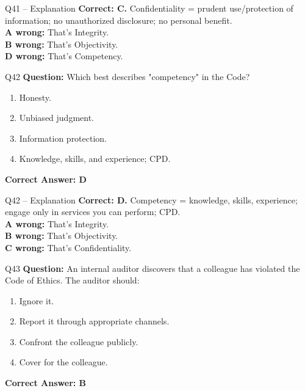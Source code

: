\documentclass[aspectratio=169,10pt]{beamer}
\begin{document}
	\begin{frame}[t]{Q41 -- Explanation}
		\small
		\textbf{Correct: C.} Confidentiality = prudent use/protection of information; no unauthorized disclosure; no personal benefit. \\[4pt]
		\textbf{A wrong:} That's Integrity. \\[2pt]
		\textbf{B wrong:} That's Objectivity. \\[2pt]
		\textbf{D wrong:} That's Competency.
	\end{frame}
	
	\begin{frame}[t]{Q42}
		\small
		\textbf{Question:} Which best describes "competency" in the Code?
		\begin{enumerate}[label=\Alph*.,itemsep=1pt,topsep=2pt]
			\item Honesty.
			\item Unbiased judgment.
			\item Information protection.
			\item Knowledge, skills, and experience; CPD.
		\end{enumerate}
		\vspace{4pt}
		\textbf{Correct Answer: D}
	\end{frame}
	
	\begin{frame}[t]{Q42 -- Explanation}
		\small
		\textbf{Correct: D.} Competency = knowledge, skills, experience; engage only in services you can perform; CPD. \\[4pt]
		\textbf{A wrong:} That's Integrity. \\[2pt]
		\textbf{B wrong:} That's Objectivity. \\[2pt]
		\textbf{C wrong:} That's Confidentiality.
	\end{frame}
	
	\begin{frame}[t]{Q43}
		\small
		\textbf{Question:} An internal auditor discovers that a colleague has violated the Code of Ethics. The auditor should:
		\begin{enumerate}[label=\Alph*.,itemsep=1pt,topsep=2pt]
			\item Ignore it.
			\item Report it through appropriate channels.
			\item Confront the colleague publicly.
			\item Cover for the colleague.
		\end{enumerate}
		\vspace{4pt}
		\textbf{Correct Answer: B}
	\end{frame}
	
\end{document}
